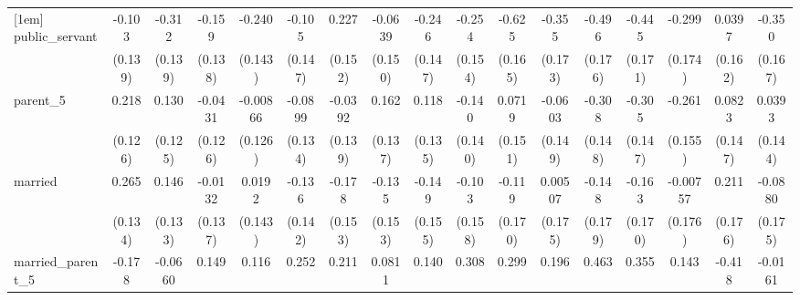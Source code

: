 {\begin{tabular}{l*{16}{c}}
[1em]
public\_servant      &      -0.103         &      -0.312\sym{*}  &      -0.159         &      -0.240         &      -0.105         &       0.227         &     -0.0639         &      -0.246         &      -0.254         &      -0.625\sym{***}&      -0.355\sym{*}  &      -0.496\sym{**} &      -0.445\sym{**} &      -0.299         &      0.0397         &      -0.350\sym{*}  \\
                    &     (0.139)         &     (0.139)         &     (0.138)         &     (0.143)         &     (0.147)         &     (0.152)         &     (0.150)         &     (0.147)         &     (0.154)         &     (0.165)         &     (0.173)         &     (0.176)         &     (0.171)         &     (0.174)         &     (0.162)         &     (0.167)         \\
[1em]
parent\_5            &       0.218         &       0.130         &     -0.0431         &    -0.00866         &     -0.0899         &     -0.0392         &       0.162         &       0.118         &      -0.140         &      0.0719         &     -0.0603         &      -0.308\sym{*}  &      -0.305\sym{*}  &      -0.261         &      0.0823         &      0.0393         \\
                    &     (0.126)         &     (0.125)         &     (0.126)         &     (0.126)         &     (0.134)         &     (0.139)         &     (0.137)         &     (0.135)         &     (0.140)         &     (0.151)         &     (0.149)         &     (0.148)         &     (0.147)         &     (0.155)         &     (0.147)         &     (0.144)         \\
[1em]
married             &       0.265\sym{*}  &       0.146         &     -0.0132         &      0.0192         &      -0.136         &      -0.178         &      -0.135         &      -0.149         &      -0.103         &      -0.119         &     0.00507         &      -0.148         &      -0.163         &    -0.00757         &       0.211         &     -0.0880         \\
                    &     (0.134)         &     (0.133)         &     (0.137)         &     (0.143)         &     (0.142)         &     (0.153)         &     (0.153)         &     (0.155)         &     (0.158)         &     (0.170)         &     (0.175)         &     (0.179)         &     (0.170)         &     (0.176)         &     (0.176)         &     (0.175)         \\
[1em]
married\_parent\_5    &      -0.178         &     -0.0660         &       0.149         &       0.116         &       0.252         &       0.211         &      0.0811         &       0.140         &       0.308         &       0.299         &       0.196         &       0.463\sym{*}  &       0.355         &       0.143         &      -0.418         &     -0.0161         \\

\end{tabular}}

